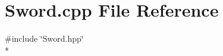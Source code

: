 \section{Sword.\-cpp File Reference}
\label{_sword_8cpp}
{\ttfamily \#include \char`\"{}Sword.\-hpp\char`\"{}}\\*
